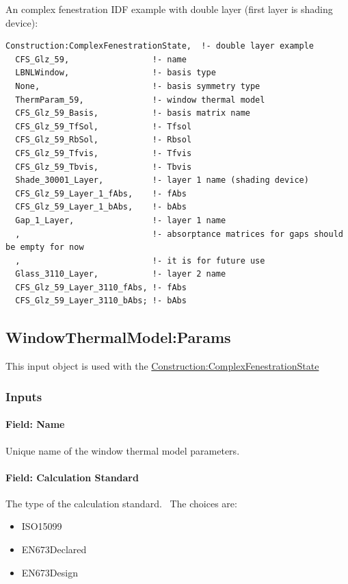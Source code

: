 An complex fenestration IDF example with double layer (first layer is shading device):

\begin{lstlisting}
Construction:ComplexFenestrationState,  !- double layer example
  CFS_Glz_59,                 !- name
  LBNLWindow,                 !- basis type
  None,                       !- basis symmetry type
  ThermParam_59,              !- window thermal model
  CFS_Glz_59_Basis,           !- basis matrix name
  CFS_Glz_59_TfSol,           !- Tfsol
  CFS_Glz_59_RbSol,           !- Rbsol
  CFS_Glz_59_Tfvis,           !- Tfvis
  CFS_Glz_59_Tbvis,           !- Tbvis
  Shade_30001_Layer,          !- layer 1 name (shading device)
  CFS_Glz_59_Layer_1_fAbs,    !- fAbs
  CFS_Glz_59_Layer_1_bAbs,    !- bAbs
  Gap_1_Layer,                !- layer 1 name
  ,                           !- absorptance matrices for gaps should be empty for now
  ,                           !- it is for future use
  Glass_3110_Layer,           !- layer 2 name
  CFS_Glz_59_Layer_3110_fAbs, !- fAbs
  CFS_Glz_59_Layer_3110_bAbs; !- bAbs
\end{lstlisting}

\subsection{WindowThermalModel:Params}\label{windowthermalmodelparams}

This input object is used with the \hyperref[constructioncomplexfenestrationstate]{Construction:ComplexFenestrationState}

\subsubsection{Inputs}\label{inputs-40}

\paragraph{Field: Name}\label{field-name-33-000}

Unique name of the window thermal model parameters.

\paragraph{Field: Calculation Standard}\label{field-calculation-standard}

The type of the calculation standard.~ The choices are:

\begin{itemize}
\item
  ISO15099
\item
  EN673Declared
\item
  EN673Design
\end{itemize}

